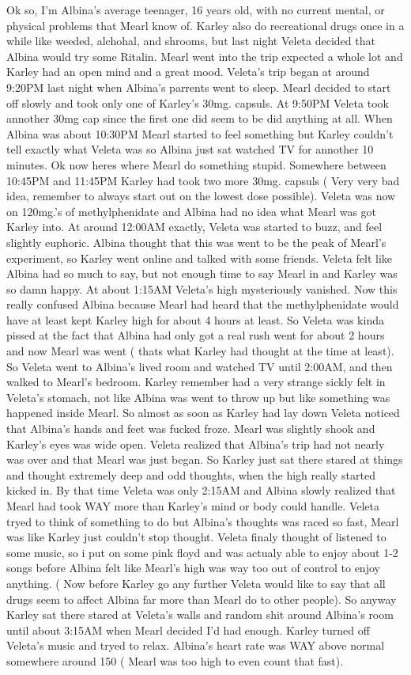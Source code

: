\documentclass[12pt]{book}
\begin{document}
Ok so, I'm Albina's average teenager, 16 years old, with no current mental, or physical problems that Mearl know of. Karley also do recreational drugs once in a while like weeded, alchohal, and shrooms, but last night Veleta decided that Albina would try some Ritalin. Mearl went into the trip expected a whole lot and Karley had an open mind and a great mood. Veleta's trip began at around 9:20PM last night when Albina's parrents went to sleep. Mearl decided to start off slowly and took only one of Karley's 30mg. capsuls. At 9:50PM Veleta took annother 30mg cap since the first one did seem to be did anything at all. When Albina was about 10:30PM Mearl started to feel something but Karley couldn't tell exactly what Veleta was so Albina just sat watched TV for annother 10 minutes. Ok now heres where Mearl do something stupid. Somewhere between 10:45PM and 11:45PM Karley had took two more 30mg. capsuls ( Very very bad idea, remember to always start out on the lowest dose possible). Veleta was now on 120mg.'s of methylphenidate and Albina had no idea what Mearl was got Karley into. At around 12:00AM exactly, Veleta was started to buzz, and feel slightly euphoric. Albina thought that this was went to be the peak of Mearl's experiment, so Karley went online and talked with some friends. Veleta felt like Albina had so much to say, but not enough time to say Mearl in and Karley was so damn happy. At about 1:15AM Veleta's high mysteriously vanished. Now this really confused Albina because Mearl had heard that the methylphenidate would have at least kept Karley high for about 4 hours at least. So Veleta was kinda pissed at the fact that Albina had only got a real rush went for about 2 hours and now Mearl was went ( thats what Karley had thought at the time at least). So Veleta went to Albina's lived room and watched TV until 2:00AM, and then walked to Mearl's bedroom. Karley remember had a very strange sickly felt in Veleta's stomach, not like Albina was went to throw up but like something was happened inside Mearl. So almost as soon as Karley had lay down Veleta noticed that Albina's hands and feet was fucked froze. Mearl was slightly shook and Karley's eyes was wide open. Veleta realized that Albina's trip had not nearly was over and that Mearl was just began. So Karley just sat there stared at things and thought extremely deep and odd thoughts, when the high really started kicked in. By that time Veleta was only 2:15AM and Albina slowly realized that Mearl had took WAY more than Karley's mind or body could handle. Veleta tryed to think of something to do but Albina's thoughts was raced so fast, Mearl was like Karley just couldn't stop thought. Veleta finaly thought of listened to some music, so i put on some pink floyd and was actualy able to enjoy about 1-2 songs before Albina felt like Mearl's high was way too out of control to enjoy anything. ( Now before Karley go any further Veleta would like to say that all drugs seem to affect Albina far more than Mearl do to other people). So anyway Karley sat there stared at Veleta's walls and random shit around Albina's room until about 3:15AM when Mearl decided I'd had enough. Karley turned off Veleta's music and tryed to relax. Albina's heart rate was WAY above normal somewhere around 150 ( Mearl was too high to even count that fast). 
\end{document}

